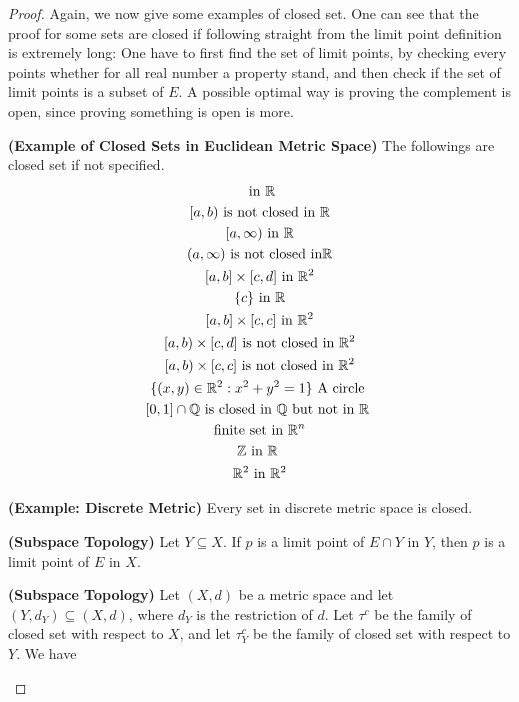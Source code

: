 \documentclass{report}
\begin{document}
\begin{proof}
{\begin{minipage}{39em}
Again, we now give some examples of closed set. One can see that the proof for some sets are closed if following straight from the limit point definition is extremely long: One have to first find the set of limit points, by checking every points whether for all real number a property stand, and then check if the set of limit points is a subset of $E$. A possible optimal way is proving the complement is open, since proving something is open is more.
\end{minipage}}
\begin{theorem}
\label{1.6.7}
\textbf{(Example of Closed Sets in Euclidean Metric Space)} The followings are closed set if not specified.
\begin{gather}
[a,b]\text{ in }\R\\
[a,b)\text{ is not closed in }\R\\
  [a,\infty)\text{ in }\R\\
  (a,\infty)\text{ is not closed in}\R\\
  [a,b]\times [c,d]\text{ in }\R^2\\
  \set{c}\text{ in }\R\\
  [a,b]\times [c,c]\text{ in }\R^2\\
  [a,b)\times [c,d]\text{ is not closed in }\R^2\\
  [a,b)\times [c,c]\text{ is not closed in }\R^2\\
 \set{(x,y)\inr^2:x^2+y^2=1}\text{ A circle }\\
[0,1]\cap \Q \text{ is closed in $\Q$ but not in  $\R$ } \\
\text{ finite set in $\R^n$ } \\
\Z  \text{ in $\R$ }\\
\R^2 \text{ in  }\R^2
\end{gather}
\end{theorem}
\begin{theorem}
\label{1.6.8}
\textbf{(Example: Discrete Metric)} Every set in discrete metric space is closed.
\end{theorem}
\begin{theorem}
\label{1.6.9}
\textbf{(Subspace Topology)} Let $Y\subseteq X$. If $p$ is a limit point of $E\cap Y$ in $Y$, then $p$ is a limit point of  $E$ in $X$. 
\end{theorem}
\begin{corollary}
\label{1.6.10}
\textbf{(Subspace Topology)} Let $(X,d)$ be a metric space and let $(Y,d_Y)\subseteq (X,d)$, where $d_Y$ is the restriction of $d$. Let $\tau^c$ be the family of closed set with respect to $X$, and let $\tau^c_Y$ be the family of closed set with respect to $Y$. We have

\end{corollary}
\end{proof}
\end{document}
